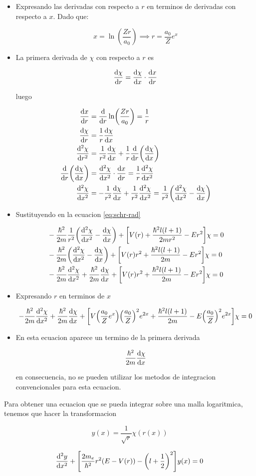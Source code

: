 \documentclass[11pt]{article}
\begin{document}
\begin{itemize}
\item Expresando las derivadas con respecto a \(r\) en terminos de derivadas con respecto a \(x\). Dado que:

\[ x = \ln(\frac{Zr}{a_0}) \implies r = \frac{a_0}{Z}e^x \]

\item La primera derivada de \(\chi\) con respecto a \(r\) es

\[ \dv{\chi}{r} = \dv{\chi}{x}\cdot \dv{x}{r} \]

luego

\begin{align*}
    \dv{x}{r} &= \dv{r}\ln(\frac{Zr}{a_0}) = \frac{1}{r} \\
    \dv{\chi}{r} &= \frac{1}{r} \dv{\chi}{x} \\
    \dv[2]{\chi}{r} &= \frac{1}{r^2} \dv{\chi}{x} + \frac{1}{r}\dv{r}(\dv{\chi}{x}) \\
    \dv{r}(\dv{\chi}{x}) &= \dv[2]{\chi}{x} \cdot \dv{x}{r} = \frac{1}{r} \dv[2]{\chi}{x} \\
    \dv[2]{\chi}{x} &= - \frac{1}{r^2}\dv{\chi}{x} + \frac{1}{r^2}\dv[2]{\chi}{x} = \frac{1}{r^2}\qty(\dv[2]{\chi}{x} - \dv{\chi}{x})
\end{align*}

\item Sustituyendo en la ecuacion \ref{eq:schr-rad}

\begin{align*}
&- \frac{\hbar^2}{2m} \frac{1}{r^2} \qty(\dv[2]{\chi}{x}-\dv{\chi}{x}) + \qty[V(r) + \frac{\hbar^2 l(l+1)}{2mr^2} - E r^2]\chi = 0 \\
&- \frac{\hbar^2}{2m}\qty(\dv[2]{\chi}{x}-\dv{\chi}{x}) + \qty[V(r) r^2 + \frac{\hbar^2 l(l+1)}{2m} - E r^2]\chi = 0 \\
&- \frac{\hbar^2}{2m}\dv[2]{\chi}{x} + \frac{\hbar^2}{2m}\dv{\chi}{x} + \qty[V(r)r^2 + \frac{\hbar^2 l(l+1)}{2m}-Er^2]\chi = 0
\end{align*}

\item Expresando \(r\) en terminos de \(x\)

\[ - \frac{\hbar^2}{2m}\dv[2]{\chi}{x} + \frac{\hbar^2}{2m}\dv{\chi}{x} + \qty[V\qty(\frac{a_0}{Z}e^x)\qty(\frac{a_0}{Z})^2 e^{2x} + \frac{\hbar^2l(l+1)}{2m}- E\qty(\frac{a_0}{Z})^2e^{2x}]\chi = 0 \]

\item En esta ecuacion aparece un termino de la primera derivada

\[ \frac{\hbar^2}{2m} \dv{\chi}{x} \]

en consecuencia, no se pueden utilizar los metodos de integracion convencionales para esta ecuacion.
\end{itemize}

Para obtener una ecuacion que se pueda integrar sobre una malla logaritmica, tenemos que hacer la transformacion

\[ y(x) = \frac{1}{\sqrt{r}}\chi(r(x)) \]

\[ \dv[2]{y}{x} + \qty[\frac{2m_e}{\hbar^2}r^2(E-V(r)) - \qty(l + \frac{1}{2})^2]y(x) = 0 \]
\end{document}
